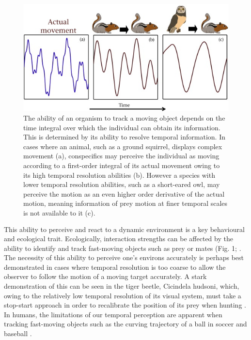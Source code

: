 \begin{figure}[h]
  \centering
  \includegraphics[width=.95\textwidth]{ch2-time/Figure_1.jpg}%
  \caption[Figure 1.]{ The ability of an organism to track a moving object depends on the time integral over which the individual can obtain its information. This is determined by its ability to resolve temporal information. In cases where an animal, such as a ground squirrel, displays complex movement (a), conspecifics may perceive the individual as moving according to a first-order integral of its actual movement owing to its high temporal resolution abilities (b). However a species with lower temporal resolution abilities, such as a short-eared owl, may perceive the motion as an even higher order derivative of the actual motion, meaning information of prey motion at finer temporal scales is not available to it (c).}
  \label{fig:Figure 1.}
\end{figure}


This ability to perceive and react to a dynamic environment is a key behavioural and ecological trait. Ecologically, interaction strengths can be affected by the ability to identify and track fast-moving objects such as prey or mates (Fig. 1; \citealt{land1974chasing, fritsches2005warm}. The necessity of this ability to perceive one's environs accurately is perhaps best demonstrated in cases where temporal resolution is too coarse to allow the observer to follow the motion of a moving target accurately. A stark demonstration of this can be seen in the tiger beetle, Cicindela hudsoni, which, owing to the relatively low temporal resolution of its visual system, must take a stop-start approach in order to recalibrate the position of its prey when hunting \citep{gilbert1997visual}. In humans, the limitations of our temporal perception are apparent when tracking fast-moving objects such as the curving trajectory of a ball in soccer \citep{dessing2010bending} and baseball \citep{bahill2004rising}.

